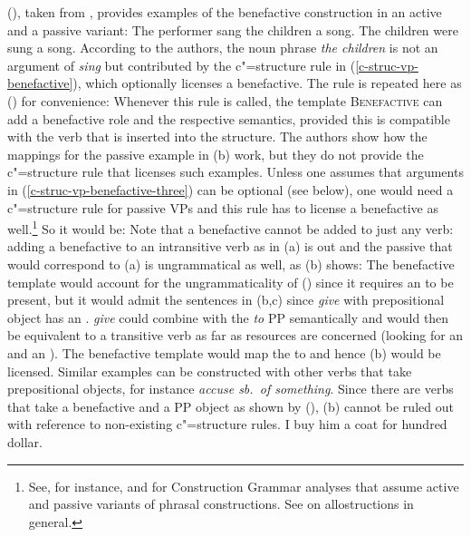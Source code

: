 (), taken from \citet[]{AGT2014a}, provides examples of the benefactive construction
in an active and a passive variant:
\eal
\ex The performer sang the children a song.
\ex The children were sung a song. 
\zl
According to the authors, the noun phrase \emph{the children} is not an argument of \emph{sing} but
contributed by the c"=structure rule in (\ref{c-struc-vp-benefactive}), which optionally licenses a
benefactive. The rule is repeated here as () for convenience:
\ea\label{c-struc-vp-benefactive-three}
\z
Whenever this rule is called, the template \textsc{Benefactive} can add a benefactive role and the
respective semantics, provided this is compatible with the verb that is inserted into the structure. The
authors show how the mappings for the passive example in (b) work, but they do not provide
the c"=structure rule that licenses such examples. Unless one assumes that arguments in
(\ref{c-struc-vp-benefactive-three}) can be optional (see below), one would need a c"=structure rule for
passive VPs and this rule has to license a benefactive as well.\footnote{%
  See, for instance,  and  for Construction Grammar analyses that assume active
  and passive variants of phrasal constructions. See  on allostructions in general.
  } So it would be:
\ea\label{c-struc-vp-benefactive-passive}
\z
Note that a benefactive cannot be added to just any verb: adding a benefactive to an intransitive verb as
in (a) is out and the passive that would correspond to (a) is ungrammatical as well,
as (b) shows:
\eal
{}
\zl
The benefactive template would account for the ungrammaticality of () since it requires an
\argtwo to be present, but it would admit the sentences in (b,c) since \emph{give} with
prepositional object has an \argtwo \citep[]{Kibort2008a}.
\eal
{}
\zl
\emph{give} could combine with the \emph{to} PP semantically and would then be equivalent to a
transitive verb as far as resources are concerned (looking for an \argone and an \argtwo). The
benefactive template would map the \argtwo to \argthree and hence (b) would be
licensed. Similar examples can be constructed with other verbs that take prepositional objects, for
instance \emph{accuse sb.\ of something}.
Since there are verbs that take a benefactive and a PP object as shown by (), (b) cannot be ruled out
with reference to non-existing c"=structure rules.
\ea
I buy him a coat for hundred dollar.
\z

